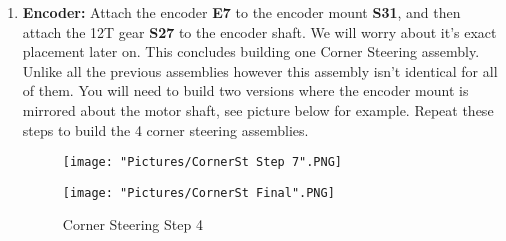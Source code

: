 \documentclass[12pt]{article}
\begin{document}
\begin{enumerate}
\item \textbf{Encoder:} Attach the encoder \textbf{E7} to the encoder mount \textbf{S31}, and then attach the 12T gear \textbf{S27} to the encoder shaft. We will worry about it's exact placement later on. This concludes building one Corner Steering assembly. Unlike all the previous assemblies however this assembly isn't identical for all of them. You will need to build two versions where the encoder mount is mirrored about the motor shaft, see picture below for example. Repeat these steps to build the 4 corner steering assemblies. 

\begin{figure}[H]
  \centering
  \begin{minipage}[b]{0.45\textwidth}
    \texttt{[image: "Pictures/CornerSt Step 7".PNG]}
  \end{minipage}
  \hfill
  \begin{minipage}[b]{0.45\textwidth}
    \texttt{[image: "Pictures/CornerSt Final".PNG]}
  \end{minipage}
  \caption{Corner Steering Step 4}
\end{figure}

\end{enumerate}
\end{document}
